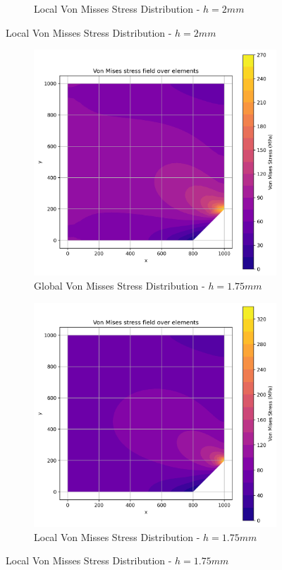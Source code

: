 \begin{figure}[H]
\begin{subfigure}[b]{0.45\textwidth}
    \caption{Local Von Misses Stress Distribution - $h=2mm$}
    \label{fig:img2}
  \end{subfigure}
\end{figure}

\begin{figure}[H]
  \centering
  \begin{subfigure}[b]{0.45\textwidth}
    \centering
    \includegraphics[width=\textwidth]{GRAFICOS/Quad4/1.75mm_global/resultados_von_mises.png}
    \caption{Global Von Misses Stress Distribution - $h=1.75mm$}
    \label{fig:img11}
  \end{subfigure}
  \hfill
  \begin{subfigure}[b]{0.45\textwidth}
    \centering
    \includegraphics[width=\textwidth]{GRAFICOS/Quad4/1.75mm_local/resultados_von_mises.png}
    \caption{Local Von Misses Stress Distribution - $h=1.75mm$}
    \label{fig:img21}
  \end{subfigure}
\end{figure}

